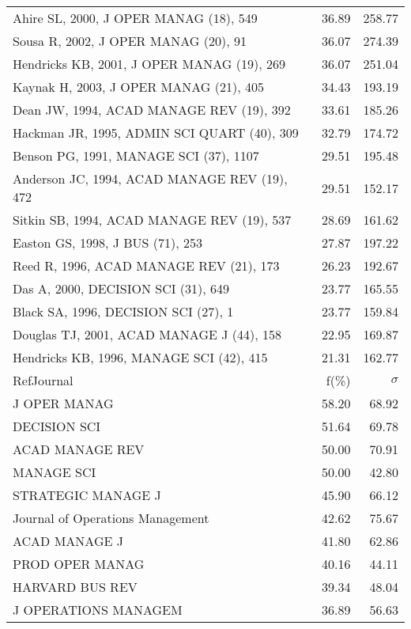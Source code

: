 \documentclass[a4paper,11pt]{report}
\begin{document}
\begin{landscape}
\begin{table}[!ht]
{\begin{tabular}{|l r r|}
Ahire SL, 2000, J OPER MANAG (18), 549 & 36.89 & 258.77\\
Sousa R, 2002, J OPER MANAG (20), 91 & 36.07 & 274.39\\
Hendricks KB, 2001, J OPER MANAG (19), 269 & 36.07 & 251.04\\
Kaynak H, 2003, J OPER MANAG (21), 405 & 34.43 & 193.19\\
Dean JW, 1994, ACAD MANAGE REV (19), 392 & 33.61 & 185.26\\
Hackman JR, 1995, ADMIN SCI QUART (40), 309 & 32.79 & 174.72\\
Benson PG, 1991, MANAGE SCI (37), 1107 & 29.51 & 195.48\\
Anderson JC, 1994, ACAD MANAGE REV (19), 472 & 29.51 & 152.17\\
Sitkin SB, 1994, ACAD MANAGE REV (19), 537 & 28.69 & 161.62\\
Easton GS, 1998, J BUS (71), 253 & 27.87 & 197.22\\
Reed R, 1996, ACAD MANAGE REV (21), 173 & 26.23 & 192.67\\
Das A, 2000, DECISION SCI (31), 649 & 23.77 & 165.55\\
Black SA, 1996, DECISION SCI (27), 1 & 23.77 & 159.84\\
Douglas TJ, 2001, ACAD MANAGE J (44), 158 & 22.95 & 169.87\\
Hendricks KB, 1996, MANAGE SCI (42), 415 & 21.31 & 162.77\\
\hline
\hline
RefJournal & f(\%) & $\sigma$\\
\hline
J OPER MANAG & 58.20 & 68.92\\
DECISION SCI & 51.64 & 69.78\\
ACAD MANAGE REV & 50.00 & 70.91\\
MANAGE SCI & 50.00 & 42.80\\
STRATEGIC MANAGE J & 45.90 & 66.12\\
Journal of Operations Management & 42.62 & 75.67\\
ACAD MANAGE J & 41.80 & 62.86\\
PROD OPER MANAG & 40.16 & 44.11\\
HARVARD BUS REV & 39.34 & 48.04\\
J OPERATIONS MANAGEM & 36.89 & 56.63\\
\hline
\end{tabular}
}
\end{table}

\clearpage


\end{landscape}
\end{document}
